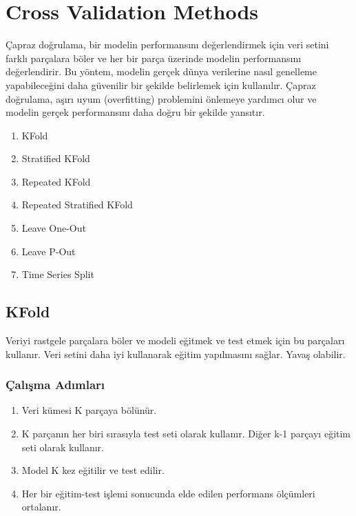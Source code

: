 \section{Cross Validation Methods}
Çapraz doğrulama, bir modelin performansını değerlendirmek için veri setini farklı parçalara böler ve her bir parça üzerinde modelin performansını değerlendirir. Bu yöntem, modelin gerçek dünya verilerine nasıl genelleme yapabileceğini daha güvenilir bir şekilde belirlemek için kullanılır. Çapraz doğrulama, aşırı uyum (overfitting) problemini önlemeye yardımcı olur ve modelin gerçek performansını daha doğru bir şekilde yansıtır.

\begin{enumerate}
    \item KFold
    \item Stratified KFold
    \item Repeated KFold
    \item Repeated Stratified KFold
    \item Leave One-Out
    \item Leave P-Out
    \item Time Series Split
\end{enumerate}

\subsection{KFold}
Veriyi rastgele parçalara böler ve modeli eğitmek ve test etmek için bu parçaları kullanır. Veri setini daha iyi kullanarak eğitim yapılmasını sağlar. Yavaş olabilir.

\subsubsection{Çalışma Adımları}
\begin{enumerate}
    \item Veri kümesi K parçaya bölünür.
    \item K parçanın her biri sırasıyla test seti olarak kullanır. Diğer k-1 parçayı eğitim seti olarak kullanır. 
    \item Model K kez eğitilir ve test edilir.
    \item Her bir eğitim-test işlemi sonucunda elde edilen performans ölçümleri ortalanır.
\end{enumerate}

\newpage

